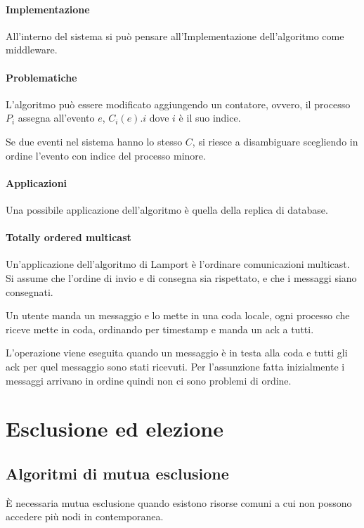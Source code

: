 \paragraph{Implementazione}
All'interno del sistema si può pensare all'Implementazione
dell'algoritmo come middleware.

\paragraph{Problematiche}
L'algoritmo può essere modificato aggiungendo un contatore, 
ovvero, il processo $P_i$ assegna all'evento 
$e$, $C_i(e).i$ dove $i$ è il suo indice.

Se due eventi nel sistema hanno lo stesso $C$, si riesce 
a disambiguare scegliendo in ordine l'evento con indice 
del processo minore.

\paragraph{Applicazioni}
Una possibile applicazione dell'algoritmo è quella 
della replica di database.

\paragraph{Totally ordered multicast}
Un'applicazione dell'algoritmo di Lamport è l'ordinare comunicazioni multicast.
Si assume che l'ordine di invio e di consegna sia rispettato, e che i messaggi 
siano consegnati.

Un utente manda un messaggio e lo mette in una coda locale, ogni 
processo che riceve mette in coda, ordinando per timestamp e manda un ack a tutti. 

L'operazione viene eseguita quando un messaggio è in testa alla coda 
e tutti gli ack per quel messaggio sono stati ricevuti. Per l'assunzione fatta inizialmente 
i messaggi arrivano in ordine quindi non ci sono problemi di ordine.

\section{Esclusione ed elezione}
\subsection{Algoritmi di mutua esclusione}
\label{mutua}
È necessaria mutua esclusione quando esistono risorse 
comuni a cui non possono accedere più nodi in contemporanea.

